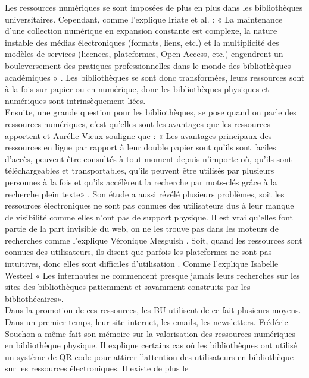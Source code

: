 \documentclass[a4paper,11pt]{article} %
\begin{document}
Les ressources numériques se sont imposées de plus en plus dans les bibliothèques 
universitaires. Cependant, comme l’explique Iriate et al. : 
« La maintenance d’une collection numérique en expansion constante est complexe, la 
nature instable des médias électroniques (formats, liens, etc.) et la multiplicité des modèles 
de services (licences, plateformes, Open Access, etc.) engendrent un bouleversement des 
pratiques professionnelles dans le monde des bibliothèques académiques » \citep{iriarte2018ebooks,}.
Les bibliothèques se sont donc transformées, leurs ressources sont à la fois sur papier ou 
en numérique, donc les bibliothèques physiques et numériques sont intrinsèquement liées. \citep{iriarte2018ebooks,}\\
Ensuite, une grande question pour les bibliothèques, se pose quand on parle des ressources numériques, c’est qu’elles sont les avantages que les ressources apportent et Aurélie Vieux souligne que : « Les avantages principaux des ressources en ligne par rapport à leur double papier sont qu’ils sont faciles d’accès, peuvent être consultés à tout moment depuis n’importe où, qu’ils sont téléchargeables et transportables, qu’ils peuvent être utilisés par plusieurs personnes à 
la fois et qu’ils accélèrent la recherche par mots-clés grâce à la recherche plein texte» \citep{vieux2014signaler,}. 
Son étude a aussi révélé plusieurs problèmes, soit les ressources électroniques ne sont pas connues des utilisateurs dus à leur manque de visibilité comme elles n’ont pas de support physique. Il est vrai qu’elles font partie de la part invisible du web, on ne les trouve pas dans les moteurs de recherches comme l’explique Véronique Mesguish \citep{mesguich2017bibliothèques,}. Soit, quand les ressources sont connues des utilisateurs, ils disent que parfois les plateformes ne sont pas intuitives, donc elles sont difficiles d’utilisation \citep{vieux2014signaler,}. Comme l’explique Isabelle Westeel « Les internautes ne commencent presque jamais leurs recherches sur les sites des bibliothèques patiemment et savamment construits par les bibliothécaires»\citep{mesguich2017bibliothèques,}.
\\Dans la promotion de ces ressources, les BU utilisent de ce fait plusieurs moyens. Dans un premier temps, leur site internet, les emails, les newsletters. Frédéric Souchon a même fait son mémoire sur la valorisation des ressources numériques en bibliothèque physique. Il explique certains cas où les bibliothèques ont utilisé un système de QR code pour attirer 
l’attention des utilisateurs en bibliothèque sur les ressources électroniques\citep{souchon2014faire,}. Il existe de plus le 
\end{document}
